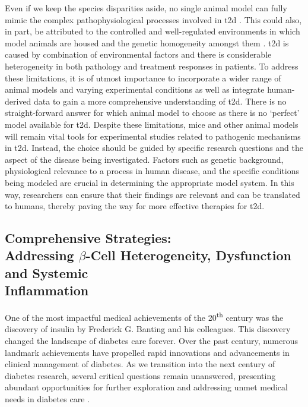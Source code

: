 \par Even if we keep the species disparities aside, no single animal model can fully mimic the complex pathophysiological processes involved in \gls{t2d} \textbf{\cite{singh_animal_2024}}. This could also, in part, be attributed to the controlled and well-regulated environments in which model animals are housed and the genetic homogeneity amongst them \textbf{\cite{bolker_animal_2017}}. \gls{t2d} is caused by combination of environmental factors and there is considerable heterogeneity in both pathology and treatment responses in patients. To address these limitations, it is of utmost importance to incorporate a wider range of animal models and varying experimental conditions as well as integrate human-derived data to gain a more comprehensive understanding of \gls{t2d}. There is no straight-forward answer for which animal model to choose as there is no `perfect' model available for \gls{t2d}. Despite these limitations, mice and other animal models will remain vital tools for experimental studies related to pathogenic mechanisms in \gls{t2d}. Instead, the choice should be guided by specific research questions and the aspect of the disease being investigated. Factors such as genetic background, physiological relevance to a process in human disease, and the specific conditions being modeled are crucial in determining the appropriate model system. In this way, researchers can ensure that their findings are relevant and can be translated to humans, thereby paving the way for more effective therapies for \gls{t2d}.

\subsection[Comprehensive \glsentryshort{t2d} Strategies:\\Addressing $\beta$-Cell Heterogeneity, Dysfunction and Systemic Inflammation]{Comprehensive  Strategies:\\Addressing $\beta$-Cell Heterogeneity, Dysfunction and Systemic\\Inflammation}
\vspace{15pt}
\par One of the most impactful medical achievements of the 20\textsuperscript{th} century was the discovery of insulin by Frederick G. Banting and his colleagues. This discovery changed the landscape of diabetes care forever. Over the past century, numerous landmark achievements have propelled rapid innovations and advancements in clinical management of diabetes. As we transition into the next century of diabetes research, several critical questions remain unanswered, presenting abundant opportunities for further exploration and addressing unmet medical needs in diabetes care \textbf{\cite{cefalu_heterogeneity_2021}}. \\    

